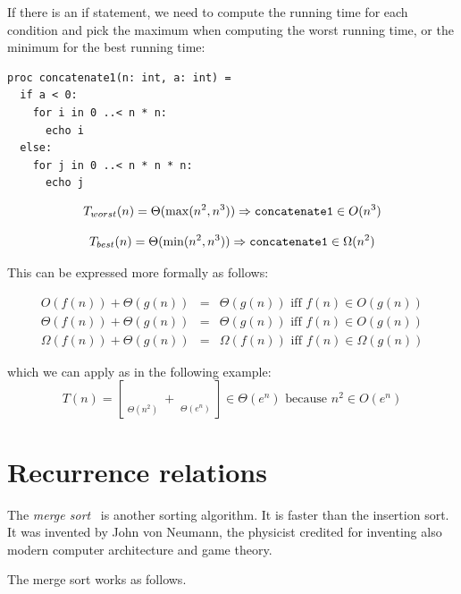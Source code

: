 \documentclass[justified, sixbynine]{tufte-book}
\def\stackunder#1#2{\mathrel{\mathop{#2}\limits_{#1}}}
\theoremstyle{plain}%
\newtheorem * {corollary}{Corollary}
\theoremstyle{definition}
\theoremstyle{remark}
\newtheorem * {remark}{Remark}
\newtheorem * {note}{Note}
\begin{document}
\begin{fullwidth}
If there is an if statement, we need to compute the running time for each condition and pick the maximum when computing the worst running time, or the minimum for the best running time:

\begin{lstlisting}
proc concatenate1(n: int, a: int) =
  if a < 0:
    for i in 0 ..< n * n:
      echo i
  else:
    for j in 0 ..< n * n * n:
      echo j
\end{lstlisting}

\begin{equation}
T_{worst}(n)=\Theta (\max (n^2, n^3))\Rightarrow \text{{\tt concatenate1}}\in O(n^3)
\end{equation}

\begin{equation}
T_{best}(n)=\Theta (\min (n^2, n^3))\Rightarrow \text{{\tt concatenate1}}\in \Omega(n^2)
\end{equation}

This can be expressed more formally as follows:

\begin{eqnarray}
O(f(n))+\Theta (g(n)) &=&\Theta (g(n))\text{ iff }f(n)\in O(g(n)) \\
\Theta (f(n))+\Theta (g(n)) &=&\Theta (g(n))\text{ iff }f(n)\in O(g(n)) \\
\Omega (f(n))+\Theta (g(n)) &=&\Omega (f(n))\text{ iff }f(n)\in \Omega (g(n))
\end{eqnarray}

which we can apply as in the following example:
\begin{equation}
T(n)=[\stackunder{\Theta (n^2)}{\underbrace{n^2+n+3}}+\stackunder{\Theta
(e^n)}{\underbrace{e^n-\log n}}]\in \Theta (e^n)\text{ because }n^2\in
O(e^n)
\end{equation}

\goodbreak\section{Recurrence relations}



The {\it merge sort}~\cite{mergesort} is another sorting algorithm. It is faster than the insertion sort. It was invented by John von Neumann, the physicist credited for inventing also modern computer architecture and game theory.

The merge sort works as follows.


\end{fullwidth}
\end{document}
